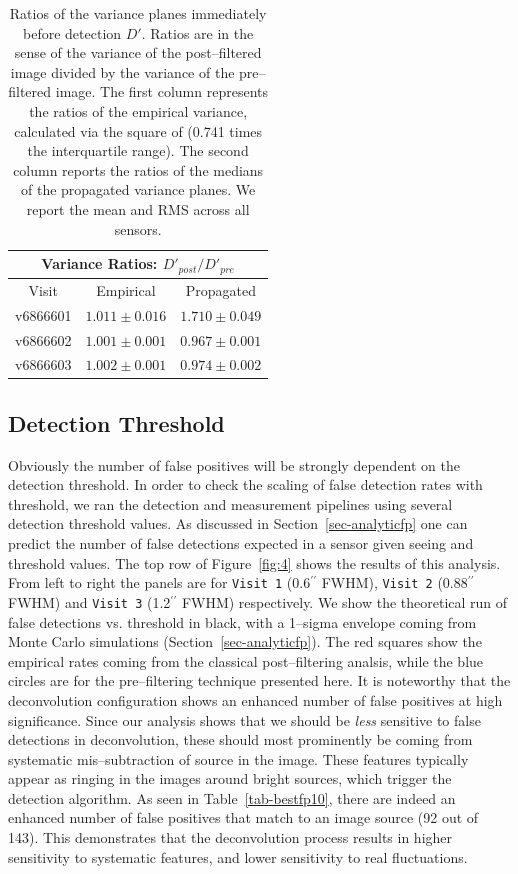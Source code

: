 \documentclass[floatfix, apj]{emulateapj}
\begin{document}
\begin{table}[t]
\centering
\begin{tabular}{ccc}
\hline
\multicolumn{3}{|c|}{Variance Ratios: $D'_{post} / D'_{pre}$} \\
\hline
Visit    & Empirical & Propagated \\
\hline
v6866601 & $1.011 \pm 0.016$    & $1.710 \pm 0.049$    \\
v6866602 & $1.001 \pm 0.001$    & $0.967 \pm 0.001$    \\
v6866603 & $1.002 \pm 0.001$    & $0.974 \pm 0.002$    \\
\end{tabular}
\caption{Ratios of the variance planes immediately before detection
  $D'$.
  Ratios are in the sense of the variance of the post--filtered
  image divided by the variance of the pre--filtered image.
  The first
  column represents the ratios of the empirical variance, calculated
  via the square of (0.741 times the interquartile range).
  The second column
  reports the ratios of the medians of the propagated variance planes.
  We report the mean and RMS across all sensors.}
\label{tab-variance2}
\end{table}


\subsection{Detection Threshold}
Obviously the number of false positives will be strongly dependent on the detection threshold.
In order to check the scaling of false detection rates with threshold, we ran the detection and measurement pipelines using several detection threshold values.
As discussed in Section~\ref{sec-analyticfp} one can predict the number of false detections expected in a sensor given seeing and threshold values.
The top row of Figure~\ref{fig:4} shows the results of this analysis.
From left to right the panels are for {\tt Visit 1} (0.6$^{\prime\prime}$ FWHM), {\tt Visit 2} (0.88$^{\prime\prime}$ FWHM) and {\tt Visit 3} (1.2$^{\prime\prime}$ FWHM) respectively.
We show the theoretical run of false detections vs. threshold in black, with a 1--sigma envelope coming from Monte Carlo simulations (Section~\ref{sec-analyticfp}).
The red squares show the empirical rates coming from the classical post--filtering analsis, while the blue circles are for the pre--filtering technique presented here.
It is noteworthy that the deconvolution configuration shows an enhanced number of false positives at high significance.
Since our analysis shows that we should be {\it less} sensitive to false detections in deconvolution, these should most prominently be coming from systematic mis--subtraction of source in the image.
These features typically appear as ringing in the images around bright sources, which trigger the detection algorithm.
As seen in Table~\ref{tab-bestfp10}, there are indeed an enhanced number of false positives that match to an image source (92 out of 143).
This demonstrates that the deconvolution process results in higher sensitivity to systematic features, and lower sensitivity to real fluctuations.
\end{document}
